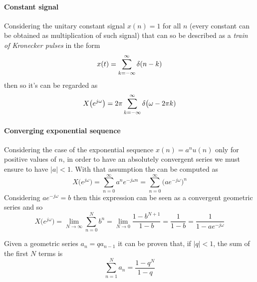 	\paragraph{Constant signal} Considering the unitary constant signal $x(n) = 1$ for all $n$ (every constant can be obtained as multiplication of such signal) that can so be described as a \textit{train of Kronecker pulses} in the form
	\[  x(t) = \sum_{k=-\infty}^\infty \delta(n-k)  \]
	then so it's \dtft can be regarded as
	\begin{equation}
		X\big(e^{j\omega}\big) = 2 \pi \sum_{k=-\infty}^\infty \delta\big(\omega - 2\pi k)
	\end{equation}
	
	\paragraph{Converging exponential sequence} Considering the case of the exponential sequence $x(n) = a^n u(n)$ only for positive values of $n$, in order to have an absolutely convergent series we must ensure to have $|a|< 1$. With that assumption the \dtft can be computed as
	\[ X\big(e^{j\omega}\big) = \sum_{n=0}^\infty a^n e^{-j\omega n} = \sum_{n=0}^\infty \big(a e^{-j\omega}\big)^n \]
	Considering $a e^{-j\omega} = b$ then this expression can be seen as a convergent geometric series and so
	\begin{equation}
		X\big(e^{j\omega}\big) = \lim_{N\rightarrow \infty} \sum_{n=0}^N b^n = \lim_{N\rightarrow 0} \frac{1-b^{N+1}}{1-b} = \frac 1 {1-b} = \frac{1}{1-ae^{-j\omega}}
	\end{equation}
	\begin{note} \label{sec:four:geometricalprogression}
		Given a geometric series $a_n = q a_{n-1}$ it can be proven that, if $|q| < 1$, the sum of the first $N$ terms is
		\[ \sum_{n=1}^N a_n = \frac{1-q^N}{1-q} \]
	\end{note}
	
	
	
	
	
	